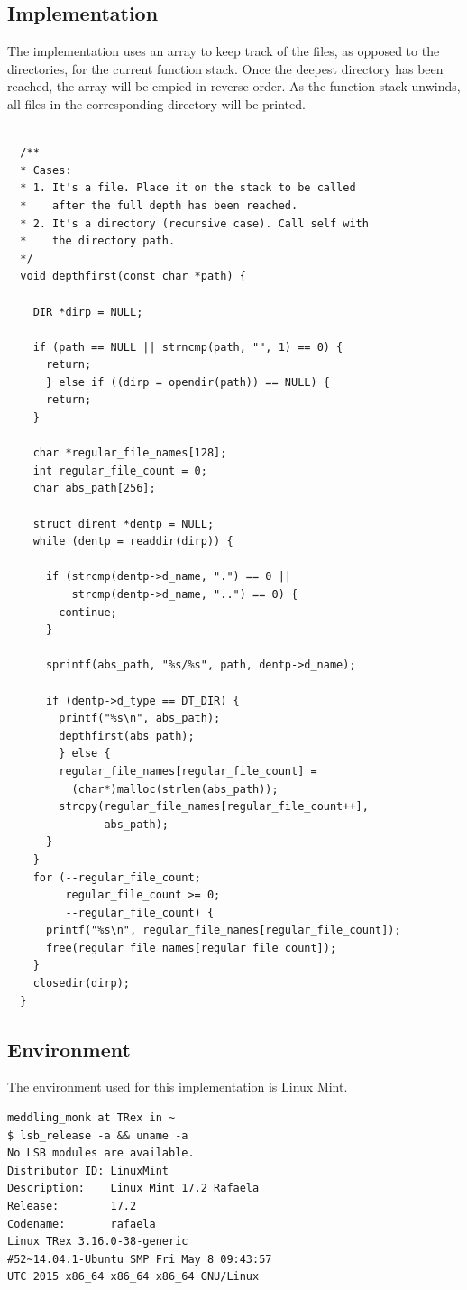 \documentclass[a4paper,12pt,sffamily]{article}
\begin{document}
\subsection{Implementation}
The implementation uses an array to keep track of the files, as opposed to the directories, for the 
current function stack. Once the deepest directory has been reached, the array will be empied in reverse 
order. As the function stack unwinds, all files in the corresponding directory will be printed.
\renewcommand{\theFancyVerbLine}{
\sffamily\textcolor[rgb]{0.5,0.5,0.5}{\scriptsize\arabic{FancyVerbLine}}}

\begin{verbatim}

  /**
  * Cases:
  * 1. It's a file. Place it on the stack to be called 
  *    after the full depth has been reached.
  * 2. It's a directory (recursive case). Call self with 
  *    the directory path.
  */
  void depthfirst(const char *path) {

    DIR *dirp = NULL;

    if (path == NULL || strncmp(path, "", 1) == 0) {
      return;
      } else if ((dirp = opendir(path)) == NULL) {
      return;
    }

    char *regular_file_names[128];
    int regular_file_count = 0;
    char abs_path[256];

    struct dirent *dentp = NULL;
    while (dentp = readdir(dirp)) {

      if (strcmp(dentp->d_name, ".") == 0 || 
          strcmp(dentp->d_name, "..") == 0) {
        continue;
      }

      sprintf(abs_path, "%s/%s", path, dentp->d_name);

      if (dentp->d_type == DT_DIR) {
        printf("%s\n", abs_path);
        depthfirst(abs_path);
        } else {
        regular_file_names[regular_file_count] = 
          (char*)malloc(strlen(abs_path));
        strcpy(regular_file_names[regular_file_count++], 
               abs_path);
      }
    }
    for (--regular_file_count; 
         regular_file_count >= 0; 
         --regular_file_count) {
      printf("%s\n", regular_file_names[regular_file_count]);
      free(regular_file_names[regular_file_count]);
    }
    closedir(dirp);
  }
\end{verbatim}
\subsection{Environment}
The environment used for this implementation is Linux Mint.
\begin{verbatim}
meddling_monk at TRex in ~
$ lsb_release -a && uname -a
No LSB modules are available.
Distributor ID: LinuxMint
Description:    Linux Mint 17.2 Rafaela
Release:        17.2
Codename:       rafaela
Linux TRex 3.16.0-38-generic
#52~14.04.1-Ubuntu SMP Fri May 8 09:43:57 
UTC 2015 x86_64 x86_64 x86_64 GNU/Linux
\end{verbatim}
\end{document}
